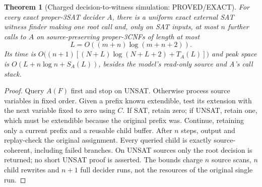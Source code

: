 \documentclass[11pt]{article}
\newtheorem{theorem}{Theorem}
\begin{document}
\begin{theorem}[Charged decision-to-witness simulation: PROVED/EXACT]
For every exact proper-3SAT decider $A$, there is a uniform exact external SAT witness finder making one root call and, only on SAT inputs, at most $n$ further calls to $A$ on source-preserving proper-3CNFs of length at most
\[
L=O((m+n)\log(m+n+2)).
\]
Its time is
$O\bigl((n+1)[(N+L)\log(N+L+2)+T_A(L)]\bigr)$
and peak space is $O(L+n\log n+S_A(L))$, besides the model's read-only source and A's call stack.
\end{theorem}
\begin{proof}
Query $A(F)$ first and stop on UNSAT. Otherwise process source variables in fixed order. Given a prefix known extendible, test its extension with the next variable fixed to zero using $C$. If SAT, retain zero; if UNSAT, retain one, which must be extendible because the original prefix was. Continue, retaining only a current prefix and a reusable child buffer. After $n$ steps, output and replay-check the original assignment. Every queried child is exactly source-coherent, including failed branches. On UNSAT sources only the root decision is returned; no short UNSAT proof is asserted. The bounds charge $n$ source scans, $n$ child rewrites and $n+1$ full decider runs, not the resources of the original single run.
\end{proof}
\end{document}
